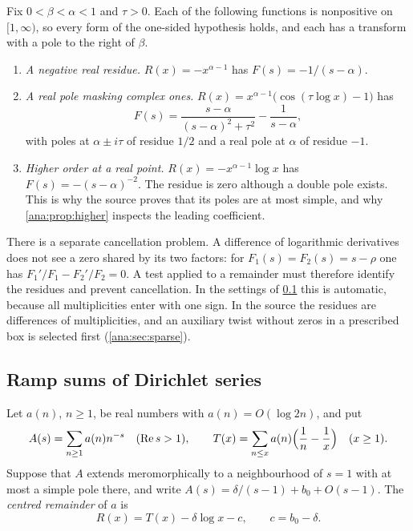\begin{remark}\label{ana:rem:hyp}
Fix $0<\beta<\alpha<1$ and $\tau>0$. Each of the following functions is nonpositive on
$[1,\infty)$, so every form of the one-sided hypothesis holds, and each has a transform with a
pole to the right of $\beta$.
\begin{enumerate}[label=\textup{(\arabic*)}]
\item \emph{A negative real residue.} $R(x)=-x^{\alpha-1}$ has $F(s)=-1/(s-\alpha)$.
\item \emph{A real pole masking complex ones.} $R(x)=x^{\alpha-1}\bigl(\cos(\tau\log x)-1\bigr)$
 has
 \[
  F(s)=\frac{s-\alpha}{(s-\alpha)^2+\tau^2}-\frac1{s-\alpha},
 \]
 with poles at $\alpha\pm i\tau$ of residue $1/2$ and a real pole at $\alpha$ of residue $-1$.
\item \emph{Higher order at a real point.} $R(x)=-x^{\alpha-1}\log x$ has
 $F(s)=-(s-\alpha)^{-2}$. The residue is zero although a double pole exists. This is why the
 source proves that its poles are at most simple, and why \cref{ana:prop:higher} inspects the
 leading coefficient.
\end{enumerate}
There is a separate cancellation problem. A difference of logarithmic derivatives does not see
a zero shared by its two factors: for $F_1(s)=F_2(s)=s-\rho$ one has $F_1'/F_1-F_2'/F_2=0$. A
test applied to a remainder must therefore identify the residues and prevent cancellation. In
the settings of \cref{ana:sec:ramp} this is automatic, because all multiplicities enter with
one sign. In the source the residues are differences of multiplicities, and an auxiliary twist
without zeros in a prescribed box is selected first (\cref{ana:sec:sparse}).
\end{remark}

\subsection{Ramp sums of Dirichlet series}\label{ana:sec:ramp}
{\raggedright{}}

\begin{definition}\label{ana:def:ramp}
Let $a(n)$, $n\ge1$, be real numbers with $a(n)=O(\log 2n)$, and put
\[
 A(s)=\sum_{n\ge1}a(n)n^{-s}\quad(\Re s>1),\qquad
 T(x)=\sum_{n\le x}a(n)\Bigl(\frac1n-\frac1x\Bigr)\quad(x\ge1).
\]
Suppose that $A$ extends meromorphically to a neighbourhood of $s=1$ with at most a simple pole
there, and write $A(s)=\delta/(s-1)+b_0+O(s-1)$. The \emph{centred remainder} of $a$ is
\[
 R(x)=T(x)-\delta\log x-c,\qquad c=b_0-\delta .
\]
\end{definition}


